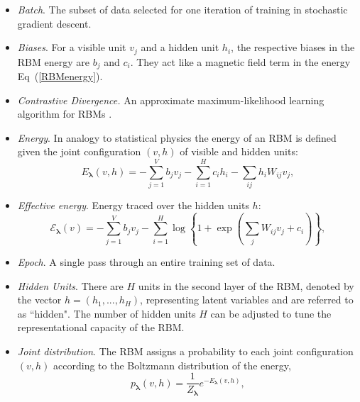 \documentclass[submission, Phys]{SciPost}
\begin{document}
\begin{itemize}

\item {\it Batch}.  The subset of data selected for one iteration of training in stochastic gradient descent.

\item {\it Biases}.  For a visible unit $v_j$ and a hidden unit $h_i$, the respective biases in the RBM energy are $b_j$ and $c_i$. They act like a magnetic field term in the energy Eq~(\ref{RBMenergy}).

\item {\it Contrastive Divergence.}  An approximate maximum-likelihood learning algorithm for RBMs \cite{hinton2002training}.

\item {\it Energy}.  In analogy to statistical physics the energy of an RBM is defined given the joint configuration $(v,h)$ of visible and hidden units:
\begin{equation}
E_{\bm{\lambda}}(v,h) = - \sum\limits_{j=1}^V b_j v_j - \sum\limits_{i=1}^H c_i h_i - \sum\limits_{ij} h_i W_{ij} v_j, \label{RBMenergy} 
\end{equation}

\item {\it Effective energy}.  Energy traced over the hidden units $h$:
\begin{equation}
\mathcal{E}_{\bm{\lambda}}(v) = - \sum\limits_{j=1}^V b_j v_j - \sum\limits_{i=1}^H \log \left\{ 1 + \exp \left( \sum\limits_{j} W_{ij}v_j +c_i\right) \right\}, \label{RBMeffectiveenergy} 
\end{equation}

\item {\it Epoch}.  A single pass through an entire training set of data.

\item {\it Hidden Units}.  There are $H$ units in the second layer of the RBM, denoted by the vector $h=(h_1, ..., h_H)$, representing latent variables and are referred to as ``hidden".  The number of hidden units $H$ can be adjusted to tune the representational capacity of the RBM.

\item {\it Joint distribution}.  The RBM assigns a probability to each joint configuration $(v,h)$ according to the Boltzmann distribution of the energy,
\begin{equation}
    p_{\bm{\lambda}}(v,h) = \frac{1}{Z_{\bm{\lambda}}} e^{-E_{\bm{\lambda}}(v,h)},
\end{equation}


\end{itemize}
\end{document}
